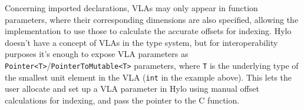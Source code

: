 Concerning imported declarations, VLAs may only appear in function parameters, where their corresponding dimensions are also specified, allowing the implementation to use those to calculate the accurate offsets for indexing. Hylo doesn't have a concept of VLAs in the type system, but for interoperability purposes it's enough to expose VLA parameters as \texttt{Pointer<T>}/\texttt{PointerToMutable<T>} parameters, where \texttt{T} is the underlying type of the smallest unit element in the VLA (\texttt{int} in the example above). This lets the user allocate and set up a VLA parameter in Hylo using manual offset calculations for indexing, and pass the pointer to the C function.
